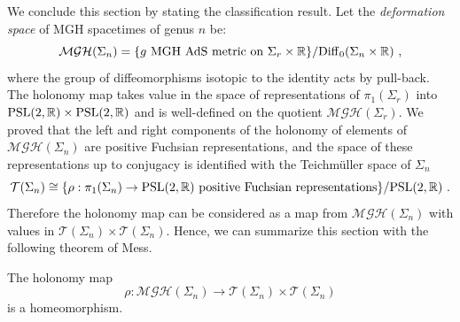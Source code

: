 We conclude this section by stating the classification result. Let the \emph{deformation space} of MGH spacetimes of genus $n$ be:
$$\mathcal{MGH}(\Sigma_n)=\{g\text{ MGH AdS metric on }\Sigma_r\times\mathbb{R}\}/\mathrm{Diff}_0(\Sigma_n\times\mathbb{R})~,$$
where the group of diffeomorphisms isotopic to the identity acts by pull-back. The holonomy map takes value in the space of representations of $\pi_1(\Sigma_r)$ into $\text{PSL}(2,\mathbb{R})\times\text{PSL}(2,\mathbb{R})$ and is well-defined on the quotient $\mathcal{MGH}(\Sigma_r)$.
We proved that the left and right components of the holonomy of elements of $\mathcal{MGH}(\Sigma_n)$ are positive Fuchsian representations, and the space of these representations up to conjugacy is identified with the Teichm\"uller space of $\Sigma_n$
\[
    \mathcal{T}(\Sigma_n)\cong\{\rho:\pi_1(\Sigma_n)\to\text{PSL}(2,\mathbb{R})\text{ positive Fuchsian representations}\}/\text{PSL}(2,\mathbb{R})~.
\]
Therefore the holonomy map can be considered as a map 
from $\mathcal{MGH}(\Sigma_n)$ with values in $\mathcal{T}(\Sigma_n)\times\mathcal{T}(\Sigma_n)$.
Hence, we can summarize this section with the following theorem of Mess.

\begin{theorem} \label{thm:classification rgeq2}
The holonomy map $$\rho:\mathcal{MGH}(\Sigma_n)\to\mathcal{T}(\Sigma_n)\times\mathcal{T}(\Sigma_n)$$ is a homeomorphism.
\end{theorem}